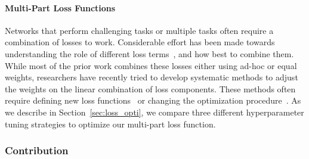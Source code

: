 \paragraph{Multi-Part Loss Functions} 
Networks that perform challenging tasks or multiple 
tasks often require a combination of losses to work. Considerable effort has been made towards understanding the role of different loss terms~\cite{huang2019addressing,barron2019general,chen2018gradnorm}, and how best to combine them. 
%
%
While most of the prior work combines these losses either using ad-hoc or equal weights, %
%
researchers have recently tried to develop systematic methods to adjust
the weights on the linear combination of loss components.
%
%
These methods often require defining new loss functions~\cite{barron2019general} or changing the optimization procedure~\cite{chen2018gradnorm}. %
%
%
As we describe in Section~\ref{sec:loss_opti}, we compare three different hyperparameter tuning strategies to optimize our multi-part loss function.

\subsubsection{Contribution}

